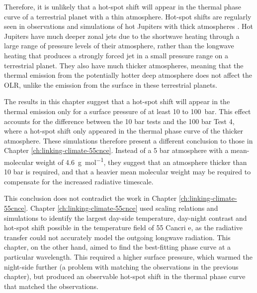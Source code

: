 Therefore, it is unlikely that a hot-spot shift will appear in the thermal phase curve of a terrestrial planet with a thin atmosphere. Hot-spot shifts are regularly seen in observations and simulations of hot Jupiters with thick atmospheres \citep{amundsen2016hd209, parmentier2017handbook}. Hot Jupiters have much deeper zonal jets due to the shortwave heating through a large range of pressure levels of their atmosphere, rather than the longwave heating that produces a strongly forced jet in a small pressure range on a terrestrial planet. They also have much thicker atmospheres, meaning that the thermal emission from the potentially hotter deep atmosphere does not affect the OLR, unlike the emission from the surface in these terrestrial planets.

 The results in this chapter suggest that a hot-spot shift will appear in the thermal emission only for a surface pressure of at least 10 to \SI{100}{\bar}. This effect accounts for the difference between the 10 bar tests and the 100 bar Test 4, where a hot-spot shift only appeared in the thermal phase curve of the thicker atmosphere. These simulations therefore present a different conclusion to those in Chapter \ref{ch:linking-climate-55cnce}. Instead of a 5 bar atmosphere with a mean-molecular weight of \SI{4.6}{\gram\per\mole}, they suggest that an atmosphere thicker than 10 bar is required, and that a heavier mean molecular weight may be required to compensate for the increased radiative timescale.

 This conclusion does not contradict the work in Chapter \ref{ch:linking-climate-55cnce}. Chapter \ref{ch:linking-climate-55cnce} used scaling relations and simulations to identify the largest day-side temperature, day-night contrast and hot-spot shift possible in the temperature field of 55 Cancri e, as the radiative transfer could not accurately model the outgoing longwave radiation. This chapter, on the other hand, aimed to find the best-fitting phase curve at a particular wavelength. This required a higher surface pressure, which warmed the night-side further (a problem with matching the observations in the previous chapter), but produced an observable hot-spot shift in the thermal phase curve that matched the observations.


